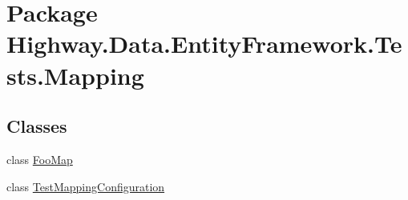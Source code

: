\hypertarget{namespace_highway_1_1_data_1_1_entity_framework_1_1_tests_1_1_mapping}{\section{Package Highway.\-Data.\-Entity\-Framework.\-Tests.\-Mapping}
\label{namespace_highway_1_1_data_1_1_entity_framework_1_1_tests_1_1_mapping}
}
\subsection*{Classes}
\begin{DoxyCompactItemize}
\item 
class \hyperlink{class_highway_1_1_data_1_1_entity_framework_1_1_tests_1_1_mapping_1_1_foo_map}{Foo\-Map}
\item 
class \hyperlink{class_highway_1_1_data_1_1_entity_framework_1_1_tests_1_1_mapping_1_1_test_mapping_configuration}{Test\-Mapping\-Configuration}
\end{DoxyCompactItemize}
